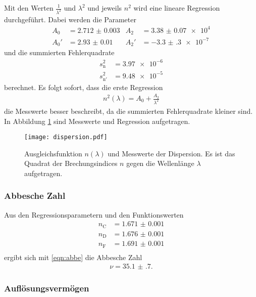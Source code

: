 \FloatBarrier

Mit den Werten $\frac{1}{\lambda^2}$ und $\lambda^2$ und jeweils $n^2$ wird
eine lineare Regression durchgeführt. Dabei werden die Parameter
\begin{align}
  A_0 & = \num{2.712(3)} & A_2 & = \num{3.38(7)e4} \\
  A_0' & = \num{2.93(1)} & A_2' & = -\num{3.3(3)e-7}
\end{align}
und die summierten Fehlerquadrate
\begin{align}
  s_\text{n}^2 & = \num{3.97e-6} \\
  s_{\text{n}'}^2 & = \num{9.48e-5}
\end{align}
berechnet. Es folgt sofort, dass die erste Regression
\begin{align}
  n^2(\lambda) = A_0 + \frac{A_2}{\lambda^2}
\end{align}
die Messwerte besser beschreibt, da die summierten Fehlerquadrate kleiner sind.
In Abbildung \ref{fig:dispersion} sind Messwerte und Regression aufgetragen.

\begin{figure}
  \centering
  \texttt{[image: dispersion.pdf]}
  \caption{Ausgleichsfunktion $n(\lambda)$ und Messwerte der Dispersion.
  Es ist das
  Quadrat der Brechungsindices $n$ gegen die Wellenlänge $\lambda$ aufgetragen.}
  \label{fig:dispersion}
\end{figure}

\FloatBarrier

\subsubsection{Abbesche Zahl}

Aus den Regressionsparametern und den Funktionswerten
\begin{align}
  n_\text{C} & = \num{1.671(1)}\\
  n_\text{D} & = \num{1.676(1)}\\
  n_\text{F} & = \num{1.691(1)}\\
\end{align}
ergibt sich mit \eqref{eqn:abbe} die
Abbesche Zahl
\begin{align}
  \nu = \num{35.1(7)}.
\end{align}

\subsubsection{Auflösungsvermögen}

